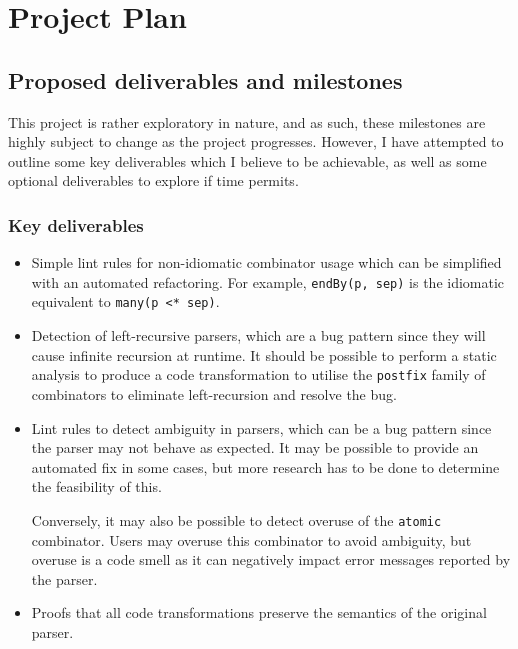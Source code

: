 \documentclass[../../main.tex]{subfiles}
\begin{document}
\chapter{Project Plan}
\section{Proposed deliverables and milestones}
This project is rather exploratory in nature, and as such, these milestones are highly subject to change as the project progresses.
However, I have attempted to outline some key deliverables which I believe to be achievable, as well as some optional deliverables to explore if time permits.

\subsection{Key deliverables}
\begin{itemize}
  \item
  Simple lint rules for non-idiomatic combinator usage which can be simplified with an automated refactoring.
  For example, \texttt{endBy(p, sep)} is the idiomatic equivalent to \texttt{many(p <* sep)}.
  \item
  Detection of left-recursive parsers, which are a bug pattern since they will cause infinite recursion at runtime.
  It should be possible to perform a static analysis to produce a code transformation to utilise the \texttt{postfix} family of combinators to eliminate left-recursion and resolve the bug.
  \item
  Lint rules to detect ambiguity in parsers, which can be a bug pattern since the parser may not behave as expected.
  It may be possible to provide an automated fix in some cases, but more research has to be done to determine the feasibility of this.

  Conversely, it may also be possible to detect overuse of the \texttt{atomic} combinator.
  Users may overuse this combinator to avoid ambiguity, but overuse is a code smell as it can negatively impact error messages reported by the parser.
  \item
  Proofs that all code transformations preserve the semantics of the original parser.
\end{itemize}
\end{document}
